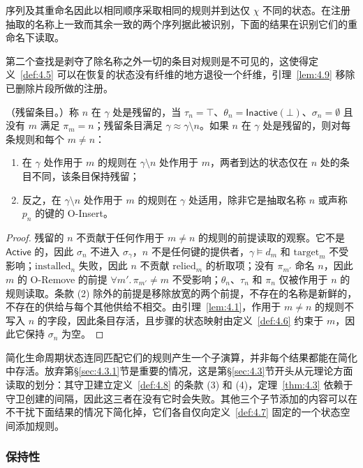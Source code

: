 序列及其重命名因此以相同顺序采取相同的规则并到达仅 $\chi$ 不同的状态。在注册抽取的名称上一致而其余一致的两个序列据此被识别，下面的结果在识别它们的重命名下读取。

第二个查找是剥夺了除名称之外一切的条目对规则是不可见的，这使得定义~\ref{def:4.5} 可以在恢复的状态没有纤维的地方退役一个纤维，引理~\ref{lem:4.9} 移除已删除片段所做的注册。

\begin{lemma}\label{lem:4.4}
（残留条目。）称 $n$ 在 $\gamma$ 处是残留的，当 $\tau_n = \top$、$\theta_n = \mathsf{Inactive}(\bot)$、$\sigma_n = \emptyset$ 且没有 $m$ 满足 $\pi_m = n$；残留条目满足 $\gamma \approx \gamma \setminus n$。如果 $n$ 在 $\gamma$ 处是残留的，则对每条规则和每个 $m \neq n$：
\begin{enumerate}
\item 在 $\gamma$ 处作用于 $m$ 的规则在 $\gamma \setminus n$ 处作用于 $m$，两者到达的状态仅在 $n$ 处的条目不同，该条目保持残留；
\item 反之，在 $\gamma \setminus n$ 处作用于 $m$ 的规则在 $\gamma$ 处适用，除非它是抽取名称 $n$ 或声称 $p_n$ 的键的 O-Insert。
\end{enumerate}
\end{lemma}

\begin{proof}
残留的 $n$ 不贡献于任何作用于 $m \neq n$ 的规则的前提读取的观察。它不是 $\mathsf{Active}$ 的，因此 $\sigma_n$ 不进入 $\sigma_\gamma$，$n$ 不是任何键的提供者，$\gamma \models d_m$ 和 $\mathrm{target}_m$ 不受影响；$\mathrm{installed}_n$ 失败，因此 $n$ 不贡献 $\mathrm{relied}_m$ 的析取项；没有 $\pi_{m'}$ 命名 $n$，因此 $m$ 的 O-Remove 的前提 $\forall m'.\, \pi_{m'} \neq m$ 不受影响；$\theta_n$、$\tau_n$ 和 $\pi_n$ 仅被作用于 $n$ 的规则读取。条款 (2) 除外的前提是移除放宽的两个前提，不存在的名称是新鲜的，不存在的供给与每个其他供给不相交。由引理~\ref{lem:4.1}，作用于 $m \neq n$ 的规则不写入 $n$ 的字段，因此条目存活，且步骤的状态映射由定义~\ref{def:4.6} 约束于 $m$，因此它保持 $\sigma_n$ 为空。
\end{proof}

简化生命周期状态连同匹配它们的规则产生一个子演算，并非每个结果都能在简化中存活。放弃第\S\ref{sec:4.3.1}节是重要的情况，这是第\S\ref{sec:4.3}节开头从元理论方面读取的划分：其守卫建立定义~\ref{def:4.8} 的条款 (3) 和 (4)，定理~\ref{thm:4.3} 依赖于守卫创建的间隔，因此这三者在没有它时会失败。其他三个子节添加的内容可以在不干扰下面结果的情况下简化掉，它们各自仅向定义~\ref{def:4.7} 固定的一个状态空间添加规则。

\subsubsection{保持性}\label{sec:4.4.1}

